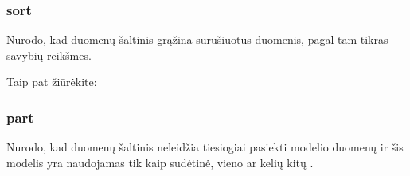 \documentclass[letterpaper,10pt,lithuanian]{sphinxmanual}
\begin{document}
\subsubsection{sort}
\label{\detokenize{modeliai/funkciniai:sort}}
\sphinxAtStartPar
Nurodo, kad duomenų šaltinis grąžina surūšiuotus duomenis, pagal tam tikras
savybių reikšmes.


\begin{sphinxseealso}{Taip pat žiūrėkite:}

\begin{DUlineblock}{0em}
\item[] {\hyperref[\detokenize{formules:sort}]{}}
\end{DUlineblock}


\end{sphinxseealso}



\subsubsection{part}
\label{\detokenize{modeliai/funkciniai:part}}\label{\detokenize{modeliai/funkciniai:func-model-part}}
\sphinxAtStartPar
Nurodo, kad duomenų šaltinis neleidžia tiesiogiai pasiekti modelio duomenų ir
šis modelis yra naudojamas tik kaip sudėtinė, vieno ar kelių kitų
{\hyperref[\detokenize{identifikatoriai:ref-denorm}]{}}.
\end{document}
